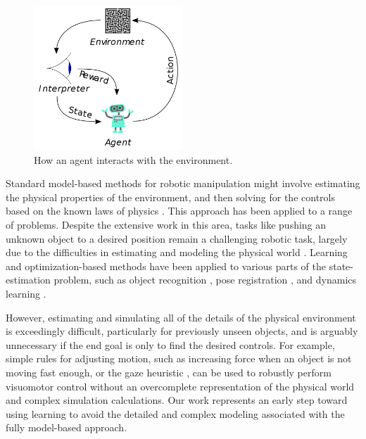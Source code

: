 \begin{figure}[h] 
\centering
\includegraphics[width=0.5\textwidth]{figs/ch1/Reinforcement_learning_diagram}
\caption{How an agent interacts with the environment.}
\label{fig:deepmind}
\end{figure}

Standard model-based methods for robotic manipulation might involve estimating the physical properties of the environment, and then solving for the controls based on the known laws of physics \cite{OK-Robot-1987} \cite{Predictive2014} \cite{PlanningFramework2012}. This approach has been applied to a range of problems. Despite the extensive work in this area, tasks like pushing an unknown object to a desired position remain a challenging robotic task, largely due to the difficulties in estimating and modeling the physical world \cite{IROS2016}. Learning and optimization-based methods have been applied to various parts of the state-estimation problem, such as object recognition \cite{Visual1995}, pose registration \cite{ObjectRecognition2009}, and dynamics learning \cite{DynamicsDoor2013}.

However, estimating and simulating all of the details of the physical environment is exceedingly difficult, particularly for previously unseen objects, and is arguably unnecessary if the end goal is only to find the desired controls. For example, simple rules for adjusting motion, such as increasing force when an object is not moving fast enough, or the gaze heuristic \cite{FieldersNature2003}, can be used to robustly perform visuomotor control without an overcomplete representation of the physical world and complex simulation calculations. Our work represents an early step toward using learning to avoid the detailed and complex modeling associated with the fully model-based approach.

